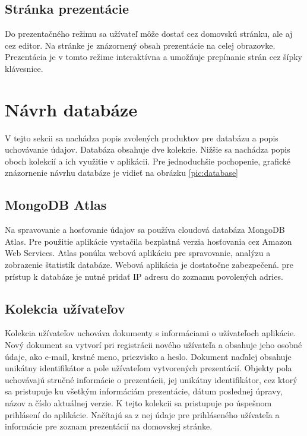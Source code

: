 \subsection*{Stránka prezentácie}
Do prezentačného režimu sa užívateľ môže dostať cez domovskú stránku, ale aj cez editor. Na stránke je znázornený obsah prezentácie na celej obrazovke. Prezentácia je v tomto režime interaktívna a umožňuje prepínanie strán cez šípky klávesnice.

\section{Návrh databáze}
\label{navrhdb}
V tejto sekcii sa nachádza popis zvolených produktov pre databázu a popis uchovávanie údajov. Databáza obsahuje dve kolekcie. Nižšie sa nachádza popis oboch kolekcií a ich využitie v aplikácii. Pre jednoduchšie pochopenie, grafické znázornenie návrhu databáze je vidieť na obrázku \ref{pic:database}

\subsection*{MongoDB Atlas}
Na spravovanie a hosťovanie údajov sa používa cloudová databáza MongoDB Atlas. Pre použitie aplikácie vystačila bezplatná verzia hosťovania cez Amazon Web Services. Atlas ponúka webovú aplikáciu pre spravovanie, analýzu a zobrazenie štatistík databáze. Webová aplikácia je dostatočne zabezpečená. pre prístup k databáze je nutné pridať IP adresu do zoznamu povolených adries.  

\subsection*{Kolekcia užívateľov}
Kolekcia užívateľov uchováva dokumenty s informáciami o užívateľoch aplikácie. Nový dokument sa vytvorí pri registrácii nového užívateľa a obsahuje jeho osobné údaje, ako e-mail, krstné meno, priezvisko a heslo. Dokument naďalej obsahuje unikátny identifikátor a pole užívateľom vytvorených prezentácií. Objekty pola uchovávajú stručné informácie o prezentácii, jej unikátny identifikátor, cez ktorý sa pristupuje ku všetkým informáciám prezentácie, dátum poslednej úpravy, názov a číslo aktuálnej verzie. K tejto kolekcii sa pristupuje po úspešnom prihlásení do aplikácie. Načítajú sa z nej údaje pre prihláseného užívateľa a informácie pre zoznam prezentácií na domovskej stránke. 

